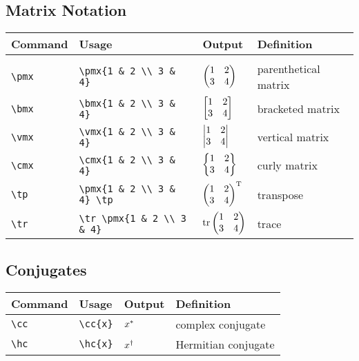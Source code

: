 \documentclass[11pt]{article}
\begin{document}
\subsection{Matrix Notation}

\begin{tabular}{llll}
    Command     & Usage                           & Output                     & Definition           \\
    \hline                                                                                            \\ [-3ex]
    \verb|\pmx| & \verb|\pmx{1 & 2 \\ 3 & 4}|     & $\begin{pmatrix} 1 & 2 \\ 3 & 4 \end{pmatrix}$     & parenthetical matrix \\ [3ex]
    \verb|\bmx| & \verb|\bmx{1 & 2 \\ 3 & 4}|     & $\begin{bmatrix} 1 & 2 \\ 3 & 4 \end{bmatrix}$     & bracketed matrix     \\ [3ex]
    \verb|\vmx| & \verb|\vmx{1 & 2 \\ 3 & 4}|     & $\begin{vmatrix} 1 & 2 \\ 3 & 4 \end{vmatrix}$     & vertical matrix      \\ [3ex]
    \verb|\cmx| & \verb|\cmx{1 & 2 \\ 3 & 4}|     & $\begin{Bmatrix} 1 & 2 \\ 3 & 4 \end{Bmatrix}$     & curly matrix         \\ [3ex]
    \verb|\tp|  & \verb|\pmx{1 & 2 \\ 3 & 4} \tp| & $\begin{pmatrix} 1 & 2 \\ 3 & 4 \end{pmatrix} ^\mathrm{T}$ & transpose            \\ [3ex]
    \verb|\tr|  & \verb|\tr \pmx{1 & 2 \\ 3 & 4}| & $\operatorname{tr} \begin{pmatrix} 1 & 2 \\ 3 & 4 \end{pmatrix}$ & trace                \\
\end{tabular}

\subsection{Conjugates}

\begin{tabular}{llll}
    Command    & Usage         & Output   & Definition          \\
    \hline
    \verb|\cc| & \verb|\cc{x}| & $x^*$ & complex conjugate   \\
    \verb|\hc| & \verb|\hc{x}| & $x^\dag$ & Hermitian conjugate \\
\end{tabular}
\end{document}
